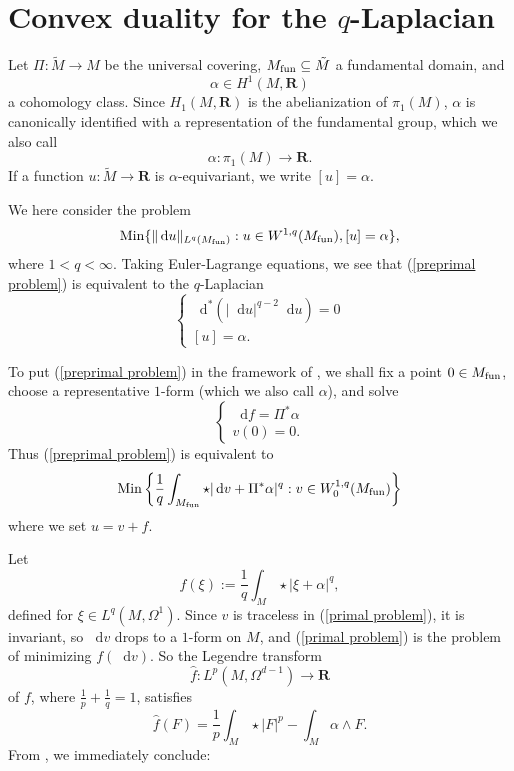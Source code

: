 \documentclass[reqno,11pt]{amsart}
\newcommand{\RR}{\mathbf{R}}
\newcommand*\dif{\mathop{}\!\mathrm{d}}
\newcommand{\Min}{\mathrm{Min}}
\theoremstyle{definition}
\numberwithin{equation}{section}
\begin{document}
\section{Convex duality for the \texorpdfstring{$q$-Laplacian}{q-Laplacian}}
Let $\Pi: \tilde M \to M$ be the universal covering, $M_{\rm fun} \subseteq \tilde M$ a fundamental domain, and
$$\alpha \in H^1(M, \RR)$$
a cohomology class.
Since $H_1(M, \RR)$ is the abelianization of $\pi_1(M)$, $\alpha$ is canonically identified with a representation of the fundamental group, which we also call
$$\alpha: \pi_1(M) \to \RR.$$
If a function $u: \tilde M \to \RR$ is $\alpha$-equivariant, we write $[u] = \alpha$.

We here consider the problem
\begin{equation}\label{preprimal problem}
	\Min\{\|\dif u\|_{L^q(M_{\rm fun})}: u \in W^{1, q}(M_{\rm fun}), [u] = \alpha\},
\end{equation}
where $1 < q < \infty$.
Taking Euler-Lagrange equations, we see that (\ref{preprimal problem}) is equivalent to the $q$-Laplacian 
$$\begin{cases}
	\dif^*(|\dif u|^{q - 2} \dif u) = 0 \\
	[u] = \alpha.
\end{cases}$$

To put (\ref{preprimal problem}) in the framework of \cite[Chapter IV]{Ekeland99}, we shall fix a point $0 \in M_{\rm fun}$, choose a representative $1$-form (which we also call $\alpha$), and solve 
$$\begin{cases}
\dif f = \Pi^* \alpha \\
v(0) = 0.
\end{cases}$$
Thus (\ref{preprimal problem}) is equivalent to
\begin{equation}\label{primal problem}
	\Min\left\{\frac{1}{q} \int_{M_{\rm fun}} \star|\dif v + \Pi^* \alpha|^q: v \in W^{1, q}_0(M_{\rm fun})\right\}
\end{equation}
where we set $u = v + f$.

Let
$$f(\xi) := \frac{1}{q} \int_M \star|\xi + \alpha|^q,$$
defined for $\xi \in L^q(M, \Omega^1)$.
Since $v$ is traceless in (\ref{primal problem}), it is invariant, so $\dif v$ drops to a $1$-form on $M$, and (\ref{primal problem}) is the problem of minimizing $f(\dif v)$.
So the Legendre transform
$$\hat f: L^p(M, \Omega^{d - 1}) \to \RR$$
of $f$, where $\frac{1}{p} + \frac{1}{q} = 1$, satisfies
$$\hat f(F) = \frac{1}{p} \int_M \star |F|^p - \int_M \alpha \wedge F.$$
From \cite[III(4.18) and III(4.23)]{Ekeland99}, we immediately conclude:
\end{document}
